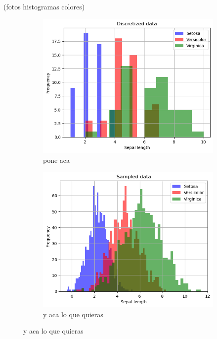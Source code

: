 \documentclass[11pt]{article}
\begin{document}
(fotos histogramas colores)
\begin{figure}[h]
\begin{subfigure}[h]{0.5\linewidth}
    \centering
    \includegraphics[width=\linewidth]{notebooks_clase_1/discretized_data_hist.png}
    \caption{pone aca }
    \label{fig:discrete}
\end{subfigure}
\begin{subfigure}[h]{0.5\linewidth}
    \centering
    \includegraphics[width=\linewidth]{notebooks_clase_1/sampled_data_hist.png}
    \caption{y aca lo que quieras}
    \label{fig:sampled}
\end{subfigure}
\end{figure}
\end{document}
